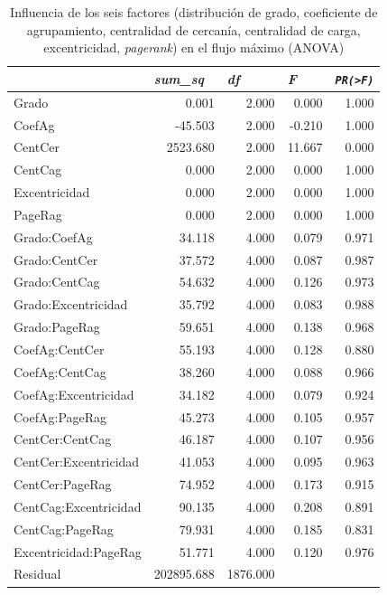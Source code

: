 \documentclass{article}
\begin{document}
\begin{table}[htbp]
  \centering
  \caption{Influencia de los seis factores (distribución de grado, coeficiente de agrupamiento, centralidad de cercanía, centralidad de carga, excentricidad, \textit{pagerank}) en el flujo máximo (ANOVA)}
    \begin{tabular}{lrrrr}
    \toprule
          & \multicolumn{1}{l}{\textit{\textbf{sum\_sq}}} & \multicolumn{1}{l}{\textit{\textbf{df}}} & \multicolumn{1}{l}{\textit{\textbf{F}}} & \multicolumn{1}{l}{\textit{\textbf{\texttt{PR(>F)}}}} \\
    \midrule
    Grado & 0.001 & 2.000 & 0.000 & 1.000 \\
    CoefAg & -45.503 & 2.000 & -0.210 & 1.000 \\
    CentCer & 2523.680 & 2.000 & 11.667 & 0.000 \\
    CentCag & 0.000 & 2.000 & 0.000 & 1.000 \\
    Excentricidad & 0.000 & 2.000 & 0.000 & 1.000 \\
    PageRag & 0.000 & 2.000 & 0.000 & 1.000 \\
    Grado:CoefAg & 34.118 & 4.000 & 0.079 & 0.971 \\
    Grado:CentCer & 37.572 & 4.000 & 0.087 & 0.987 \\
    Grado:CentCag & 54.632 & 4.000 & 0.126 & 0.973 \\
    Grado:Excentricidad & 35.792 & 4.000 & 0.083 & 0.988 \\
    Grado:PageRag & 59.651 & 4.000 & 0.138 & 0.968 \\
    CoefAg:CentCer & 55.193 & 4.000 & 0.128 & 0.880 \\
    CoefAg:CentCag & 38.260 & 4.000 & 0.088 & 0.966 \\
    CoefAg:Excentricidad & 34.182 & 4.000 & 0.079 & 0.924 \\
    CoefAg:PageRag & 45.273 & 4.000 & 0.105 & 0.957 \\
    CentCer:CentCag & 46.187 & 4.000 & 0.107 & 0.956 \\
    CentCer:Excentricidad & 41.053 & 4.000 & 0.095 & 0.963 \\
    CentCer:PageRag & 74.952 & 4.000 & 0.173 & 0.915 \\
    CentCag:Excentricidad & 90.135 & 4.000 & 0.208 & 0.891 \\
    CentCag:PageRag & 79.931 & 4.000 & 0.185 & 0.831 \\
    Excentricidad:PageRag & 51.771 & 4.000 & 0.120 & 0.976 \\
    Residual & 202895.688 & 1876.000 &       &  \\
    \bottomrule
    \end{tabular}%
  \label{tab:t33}%
\end{table}%
 
\end{document}

